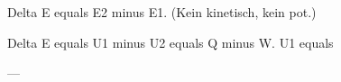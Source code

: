 Delta E equals E2 minus E1.  
(Kein kinetisch, kein pot.)  

Delta E equals U1 minus U2 equals Q minus W.  
U1 equals  

---
